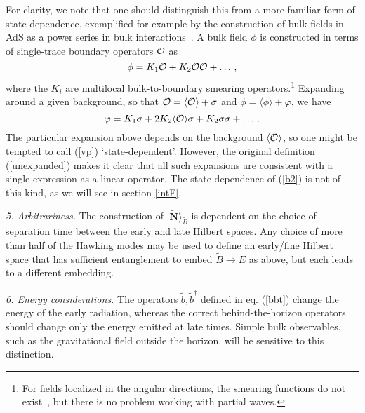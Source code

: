 \documentclass[12pt]{article}
\newcommand{\be}{\begin{equation}}
\newcommand{\ee}{\end{equation}}
\begin{document}
For clarity, we note that one should distinguish this from a more familiar form of state dependence, exemplified for example by the construction of bulk fields in AdS as a power series in bulk interactions~\cite{Kabat:2011rz,Heemskerk:2012mn}. A bulk field $\phi$ is constructed in terms of single-trace boundary operators ${\cal O}$ as
\be
\label{unexpanded}
\phi = K_1 {\cal O} + K_2 {\cal O}{\cal O}  + \ldots  \,,
\ee
where the $K_i$ are multilocal bulk-to-boundary smearing operators.\footnote{For fields localized in the angular directions, the smearing functions do not exist~\cite{Hamilton:2006fh,Papadodimas:2012aq,Bousso:2012mh}, but there is no problem working with partial waves.}
Expanding around a given background, so that ${\cal O} = \langle {\cal O} \rangle +\sigma$ and
$\phi = \langle \phi \rangle + \varphi$,
we have
\be
\label{vp}
\varphi = K_1 \sigma + 2K_2  \langle {\cal O} \rangle \sigma
+ K_2 \sigma\sigma + \ldots \,.
\ee
The particular expansion above depends on the background $ \langle {\cal O} \rangle$, so one might be tempted to call (\ref{vp}) `state-dependent'. However, the original definition (\ref{unexpanded}) makes it clear that all such expansions are consistent with a single expression as a linear operator. The state-dependence of (\ref{b2}) is not of this kind, as we will see in section \ref{intF}.


{\it 5. Arbitrariness.}  The construction of $|\tilde {\bm N} \rangle_{\tilde B}$ is dependent on the choice of separation time between the early and late Hilbert spaces.  Any choice of more than half of the Hawking modes may be used to define an early/fine Hilbert space that has sufficient entanglement to embed $\tilde B \to E$ as above,  but each leads to a different embedding.

{\it 6. Energy considerations.} The operators $\tilde{b},\tilde{b}^\dagger$ defined in eq. (\ref{bbt}) change the energy of the early radiation, whereas the correct behind-the-horizon operators should change only the energy emitted at late times. Simple bulk observables, such as the gravitational field outside the horizon, will be sensitive to this distinction.
\end{document}
